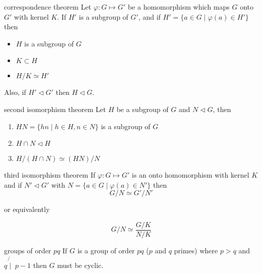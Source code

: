 \documentclass[avery5371,grid]{flashcards}
\begin{document}
\begin{flashcard}[Theorem]{correspondence theorem}
Let $\varphi : G \mapsto G'$ be a homomorphism which maps $G$
onto $G'$ with kernel $K$.  If $H'$ is a subgroup of $G'$, and if
$H' = \lbrace a \in G \mid \varphi (a) \in H' \rbrace$ then
\begin{itemize}
\item $H$ is a subgroup of $G$
\item $K \subset H$
\item $H/K \simeq H'$
\end{itemize}
Also, if $H' \lhd G'$ then $H \lhd G$.
\end{flashcard}

\begin{flashcard}[Theorem]{second isomorphism theorem}
Let $H$ be a subgroup of $G$ and $N \lhd G$, then
\begin{enumerate}
\item $HN = \lbrace hn \mid h\in H, n\in N \rbrace$ is a subgroup of $G$
\item $H\cap N \lhd H$
\item $H/(H\cap N) \simeq (HN)/N$
\end{enumerate}
\end{flashcard}

\begin{flashcard}[Theorem]{third isomorphism theorem}
If $\varphi : G \mapsto G'$ is an onto homomorphism with kernel $K$ and
if $N' \lhd G'$ with 
$N = \lbrace a \in G \mid \varphi (a) \in N' \rbrace$ then
\begin{equation*}
G/N \simeq G'/N'
\end{equation*}
\begin{center}
or equivalently
\end{center}
\begin{equation*}
G/N \simeq \frac{G/K}{N/K}
\end{equation*}
\end{flashcard}

\begin{flashcard}[Theorem]{groups of order $pq$}
If $G$ is a group of order $pq$ ($p$ and $q$ primes) where
$p > q$ and $q \not{\mid} \; p-1$ then $G$ must be cyclic.
\end{flashcard}
\end{document}
